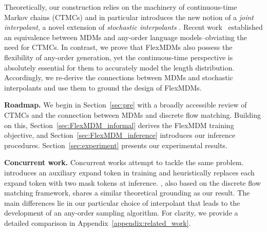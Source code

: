 Theoretically, our construction relies on the machinery of continuous-time Markov chains (CTMCs) and in particular introduces the new notion of a \emph{joint interpolant}, a novel extension of \emph{stochastic interpolants} \citep{albergo2022building, albergo2023stochastic, lipman2022flow}. Recent work~\citep{zheng2024masked,ou2024your} established an equivalence between MDMs and any-order language models--obviating the need for CTMCs. In contrast, we prove that FlexMDMs also possess the flexibility of any-order generation, yet the continuous-time perspective is absolutely essential for them to accurately model the length distribution. Accordingly, we re-derive the connections between MDMs and stochastic interpolants and use them to ground the design of FlexMDMs.




\textbf{Roadmap.} We begin in Section~\ref{sec:pre} with a broadly accessible review of CTMCs and the connection between MDMs and discrete flow matching. Building on this, Section~\ref{sec:FlexMDM_informal} derives the FlexMDM training objective, and Section~\ref{sec:FlexMDM_inference} introduces our inference procedures. Section~\ref{sec:experiment} presents our experimental results.

\textbf{Concurrent work.} Concurrent works \citep{Dreamon2025,havasi2025edit} attempt to tackle the same problem. \cite{Dreamon2025} introduces an auxiliary expand token in training and heuristically replaces each expand token with two mask tokens at inference. \cite{havasi2025edit}, also based on the discrete flow matching framework, shares a similar theoretical grounding as our result. The main differences lie in our particular choice of interpolant that leads to the development of an any-order sampling algorithm. For clarity, we provide a detailed comparison in Appendix~\ref{appendix:related_work}.
